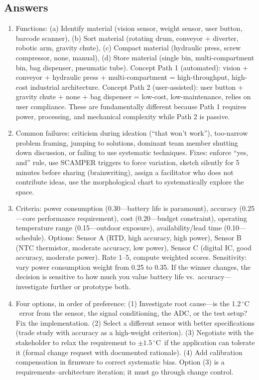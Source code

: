 \documentclass[11pt,letterpaper,twoside,openany]{book}
\newcommand{\degC}{\ensuremath{{}^{\circ}\text{C}}}
\begin{document}
\subsection{Answers}
\begin{enumerate}[leftmargin=1.5em]
\item Functions: (a) Identify material (vision sensor, weight sensor, user button, barcode scanner), (b) Sort material (rotating drum, conveyor + diverter, robotic arm, gravity chute), (c) Compact material (hydraulic press, screw compressor, none, manual), (d) Store material (single bin, multi-compartment bin, bag dispenser, pneumatic tube). Concept Path 1 (automated): vision + conveyor + hydraulic press + multi-compartment = high-throughput, high-cost industrial architecture. Concept Path 2 (user-assisted): user button + gravity chute + none + bag dispenser = low-cost, low-maintenance, relies on user compliance. These are fundamentally different because Path 1 requires power, processing, and mechanical complexity while Path 2 is passive.

\item Common failures: criticism during ideation (``that won't work''), too-narrow problem framing, jumping to solutions, dominant team member shutting down discussion, or failing to use systematic techniques. Fixes: enforce ``yes, and'' rule, use SCAMPER triggers to force variation, sketch silently for 5 minutes before sharing (brainwriting), assign a facilitator who does not contribute ideas, use the morphological chart to systematically explore the space.

\item Criteria: power consumption (0.30---battery life is paramount), accuracy (0.25---core performance requirement), cost (0.20---budget constraint), operating temperature range (0.15---outdoor exposure), availability/lead time (0.10---schedule). Options: Sensor A (RTD, high accuracy, high power), Sensor B (NTC thermistor, moderate accuracy, low power), Sensor C (digital IC, good accuracy, moderate power). Rate 1--5, compute weighted scores. Sensitivity: vary power consumption weight from 0.25 to 0.35. If the winner changes, the decision is sensitive to how much you value battery life vs.\ accuracy---investigate further or prototype both.

\item Four options, in order of preference: (1) Investigate root cause---is the 1.2\,\degC\ error from the sensor, the signal conditioning, the ADC, or the test setup? Fix the implementation. (2) Select a different sensor with better specifications (trade study with accuracy as a high-weight criterion). (3) Negotiate with the stakeholder to relax the requirement to $\pm 1.5$\,\degC\ if the application can tolerate it (formal change request with documented rationale). (4) Add calibration compensation in firmware to correct systematic bias. Option (3) is a requirements--architecture iteration; it must go through change control.


\end{enumerate}
\end{document}

